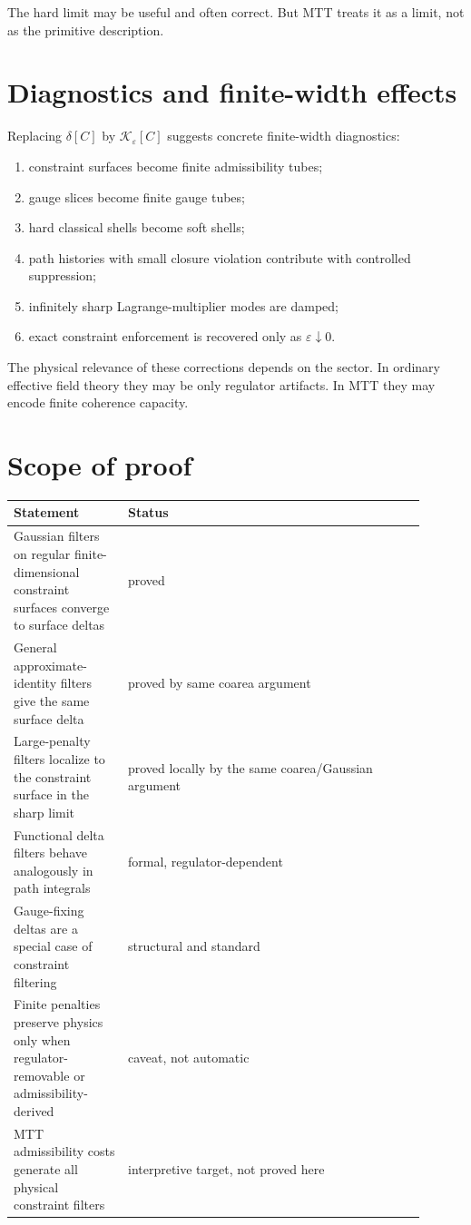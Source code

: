 \documentclass[11pt]{article}
\begin{document}
The hard limit may be useful and often correct.  But MTT treats it as a limit, not as the
primitive description.

\section{Diagnostics and finite-width effects}

Replacing \(\delta[C]\) by \(\mathcal K_\varepsilon[C]\) suggests concrete finite-width diagnostics:

\begin{enumerate}
\item constraint surfaces become finite admissibility tubes;
\item gauge slices become finite gauge tubes;
\item hard classical shells become soft shells;
\item path histories with small closure violation contribute with controlled suppression;
\item infinitely sharp Lagrange-multiplier modes are damped;
\item exact constraint enforcement is recovered only as \(\varepsilon\downarrow0\).
\end{enumerate}

The physical relevance of these corrections depends on the sector.  In ordinary effective
field theory they may be only regulator artifacts.  In MTT they may encode finite coherence
capacity.

\section{Scope of proof}

\begin{center}
\begin{tabular}{p{0.25\linewidth}p{0.65\linewidth}}
\toprule
Statement & Status \\
\midrule
Gaussian filters on regular finite-dimensional constraint surfaces converge to surface deltas & proved \\
General approximate-identity filters give the same surface delta & proved by same coarea argument \\
Large-penalty filters localize to the constraint surface in the sharp limit & proved locally by the same coarea/Gaussian argument \\
Functional delta filters behave analogously in path integrals & formal, regulator-dependent \\
Gauge-fixing deltas are a special case of constraint filtering & structural and standard \\
Finite penalties preserve physics only when regulator-removable or admissibility-derived & caveat, not automatic \\
MTT admissibility costs generate all physical constraint filters & interpretive target, not proved here \\
\bottomrule
\end{tabular}
\end{center}
\end{document}
